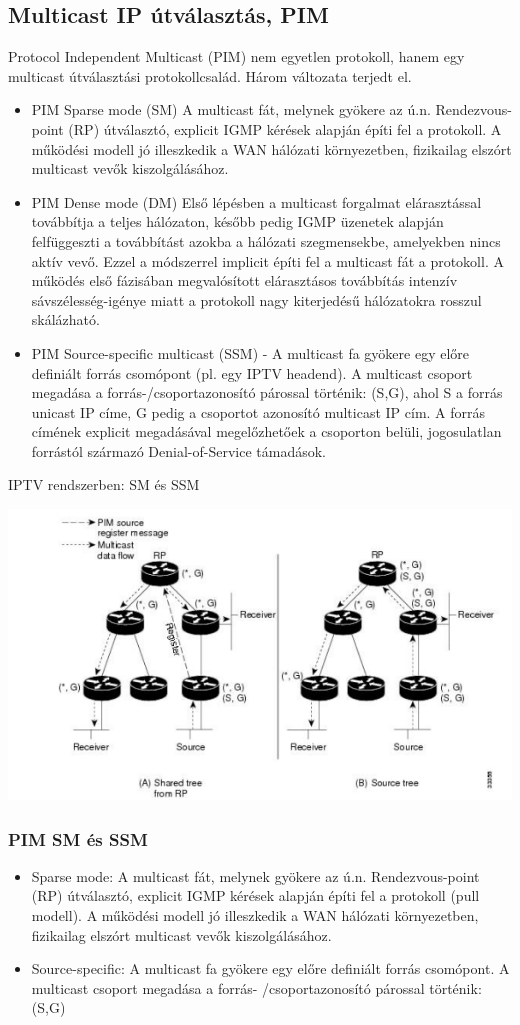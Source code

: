 \documentclass[10pt,a4paper]{article}
\begin{document}
\subsection{Multicast IP útválasztás, PIM}
Protocol Independent Multicast (PIM) nem egyetlen protokoll, hanem egy multicast útválasztási
protokollcsalád. Három változata terjedt el.
\begin{itemize}
\item PIM Sparse mode (SM)
\subitem A multicast fát, melynek gyökere az ú.n.
Rendezvous-point (RP) útválasztó, explicit IGMP kérések alapján építi fel a
protokoll. A működési modell jó illeszkedik a WAN hálózati környezetben,
fizikailag elszórt multicast vevők kiszolgálásához. 
\item PIM Dense mode (DM)
\subitem Első lépésben a multicast forgalmat
elárasztással továbbítja a teljes hálózaton, később pedig IGMP üzenetek
alapján felfüggeszti a továbbítást azokba a hálózati szegmensekbe,
amelyekben nincs aktív vevő. Ezzel a módszerrel implicit építi fel a multicast
fát a protokoll. A működés első fázisában megvalósított elárasztásos
továbbítás intenzív sávszélesség-igénye miatt a protokoll nagy kiterjedésű
hálózatokra rosszul skálázható. 
\item PIM Source-specific multicast (SSM)
\subitem - A multicast fa gyökere egy előre
definiált forrás csomópont (pl. egy IPTV headend). A multicast csoport
megadása a forrás-/csoportazonosító párossal történik: (S,G), ahol S a
forrás unicast IP címe, G pedig a csoportot azonosító multicast IP cím. A
forrás címének explicit megadásával megelőzhetőek a csoporton belüli, jogosulatlan forrástól származó Denial-of-Service támadások. 
\end{itemize}
IPTV rendszerben: SM és SSM
\begin{center}
	\includegraphics[width=0.6\linewidth]{src/PIM}
\end{center}
\subsubsection{PIM SM és SSM}
\begin{itemize}
	\item Sparse mode: A multicast fát, melynek gyökere az ú.n.
	Rendezvous-point (RP) útválasztó, explicit IGMP kérések
	alapján építi fel a protokoll (pull modell).
	A működési modell jó illeszkedik a WAN hálózati
	környezetben, fizikailag elszórt multicast vevők
	kiszolgálásához.
	\item Source-specific: A multicast fa gyökere egy előre definiált
	forrás csomópont. A multicast csoport megadása a forrás-
	/csoportazonosító párossal történik: (S,G)
\end{itemize}
\end{document}
